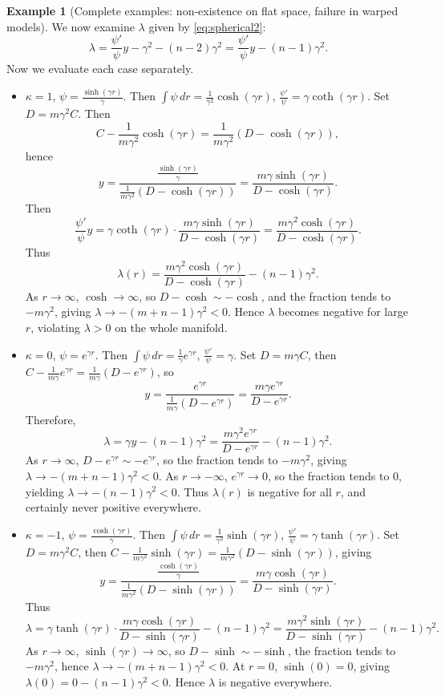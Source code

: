 \documentclass[12pt,a4paper]{article}
\theoremstyle{definition}
\newtheorem{example}[theorem]{Example}
\theoremstyle{definition}
\begin{document}
\begin{example}[Complete examples: non‑existence on flat space, failure in warped models]
We now examine $\lambda$ given by \eqref{eq:spherical2}:
\[
\lambda = \frac{\psi'}{\psi} y - \gamma^{2} - (n-2)\gamma^{2} = \frac{\psi'}{\psi} y - (n-1)\gamma^{2}.
\]
Now we evaluate each case separately.

\begin{itemize}
\item $\kappa=1$, $\psi = \frac{\sinh(\gamma r)}{\gamma}$.
Then $\int \psi\,dr = \frac{1}{\gamma^{2}}\cosh(\gamma r)$, $\frac{\psi'}{\psi} = \gamma\coth(\gamma r)$.
Set $D = m\gamma^{2} C$. Then
\[
C - \frac{1}{m\gamma^{2}}\cosh(\gamma r) = \frac{1}{m\gamma^{2}}(D - \cosh(\gamma r)),
\]
hence
\[
y = \frac{\frac{\sinh(\gamma r)}{\gamma}}{\frac{1}{m\gamma^{2}}(D - \cosh(\gamma r))}
= \frac{m\gamma \sinh(\gamma r)}{D - \cosh(\gamma r)}.
\]
Then
\[
\frac{\psi'}{\psi} y = \gamma\coth(\gamma r) \cdot \frac{m\gamma \sinh(\gamma r)}{D - \cosh(\gamma r)}
= \frac{m\gamma^{2} \cosh(\gamma r)}{D - \cosh(\gamma r)}.
\]
Thus
\[
\lambda(r) = \frac{m\gamma^{2} \cosh(\gamma r)}{D - \cosh(\gamma r)} - (n-1)\gamma^{2}.
\]
As $r\to\infty$, $\cosh\to\infty$, so $D - \cosh \sim -\cosh$, and the fraction tends to $-m\gamma^{2}$, giving $\lambda \to -(m+n-1)\gamma^{2} < 0$.
Hence $\lambda$ becomes negative for large $r$, violating $\lambda>0$ on the whole manifold.

\item $\kappa=0$, $\psi = e^{\gamma r}$.
Then $\int \psi\,dr = \frac{1}{\gamma}e^{\gamma r}$, $\frac{\psi'}{\psi} = \gamma$.
Set $D = m\gamma C$, then $C - \frac{1}{m\gamma}e^{\gamma r} = \frac{1}{m\gamma}(D - e^{\gamma r})$, so
\[
y = \frac{e^{\gamma r}}{\frac{1}{m\gamma}(D - e^{\gamma r})}
= \frac{m\gamma e^{\gamma r}}{D - e^{\gamma r}}.
\]
Therefore,
\[
\lambda = \gamma y - (n-1)\gamma^{2} = \frac{m\gamma^{2} e^{\gamma r}}{D - e^{\gamma r}} - (n-1)\gamma^{2}.
\]
As $r\to\infty$, $D - e^{\gamma r}\sim -e^{\gamma r}$, so the fraction tends to $-m\gamma^{2}$, giving $\lambda\to -(m+n-1)\gamma^{2}<0$.
As $r\to -\infty$, $e^{\gamma r}\to 0$, so the fraction tends to $0$, yielding $\lambda\to -(n-1)\gamma^{2}<0$.
Thus $\lambda(r)$ is negative for all $r$, and certainly never positive everywhere.

\item $\kappa=-1$, $\psi = \frac{\cosh(\gamma r)}{\gamma}$.
Then $\int \psi\,dr = \frac{1}{\gamma^{2}}\sinh(\gamma r)$, $\frac{\psi'}{\psi} = \gamma\tanh(\gamma r)$.
Set $D = m\gamma^{2} C$, then $C - \frac{1}{m\gamma^{2}}\sinh(\gamma r) = \frac{1}{m\gamma^{2}}(D - \sinh(\gamma r))$, giving
\[
y = \frac{\frac{\cosh(\gamma r)}{\gamma}}{\frac{1}{m\gamma^{2}}(D - \sinh(\gamma r))}
= \frac{m\gamma \cosh(\gamma r)}{D - \sinh(\gamma r)}.
\]
Thus
\[
\lambda = \gamma\tanh(\gamma r)\cdot \frac{m\gamma \cosh(\gamma r)}{D - \sinh(\gamma r)} - (n-1)\gamma^{2}
= \frac{m\gamma^{2} \sinh(\gamma r)}{D - \sinh(\gamma r)} - (n-1)\gamma^{2}.
\]
As $r\to\infty$, $\sinh(\gamma r)\to\infty$, so $D - \sinh \sim -\sinh$, the fraction tends to $-m\gamma^{2}$, hence $\lambda\to -(m+n-1)\gamma^{2}<0$.
At $r=0$, $\sinh(0)=0$, giving $\lambda(0) = 0 - (n-1)\gamma^{2} <0$.
Hence $\lambda$ is negative everywhere.
\end{itemize}


\end{example}
\end{document}

